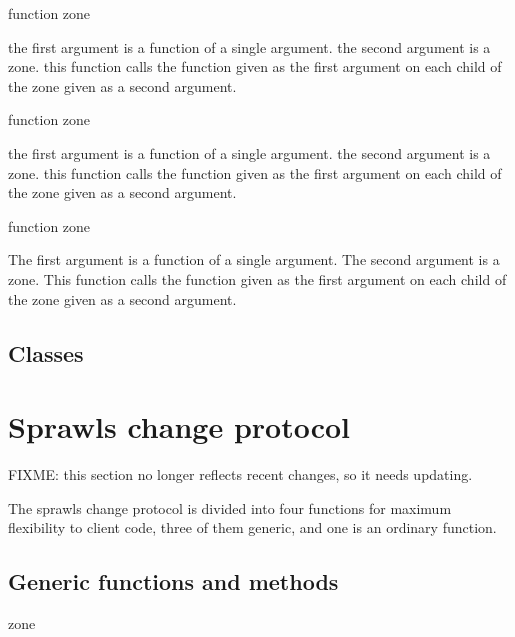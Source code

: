  {function zone}

the first argument is a function of a single argument.  the second
argument is a zone.  this function calls the function given as the
first argument on each child of the zone given as a second argument.  

 {function zone}

the first argument is a function of a single argument.  the second
argument is a zone.  this function calls the function given as the
first argument on each child of the zone given as a second argument.  

 {function zone}

The first argument is a function of a single argument.  The second
argument is a zone.  This function calls the function given as the
first argument on each child of the zone given as a second argument.  

\subsection{Classes}








\section{Sprawls change protocol}

FIXME: this section no longer reflects recent changes, so it needs
updating.

The sprawls change protocol is divided into four functions for maximum
flexibility to client code, three of them generic, and one is an
ordinary function.

\subsection{Generic functions and methods}

 {zone}

